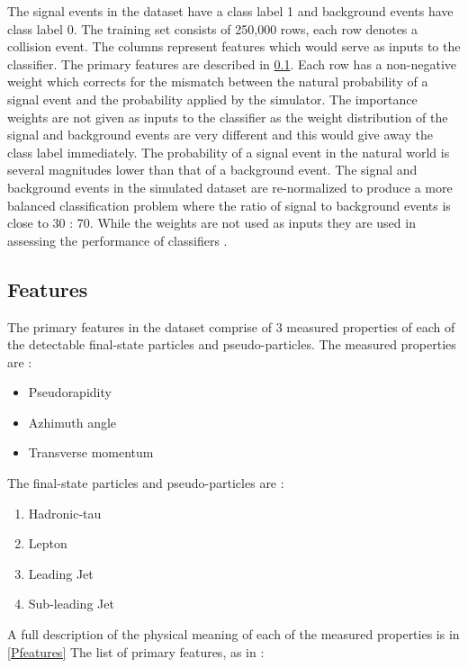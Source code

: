 \documentclass[final,3p,times,twocolumn]{elsarticle}
\begin{document}
The signal events in the dataset have a class label 1 and background events have class label 0. The training set consists of 250,000 rows, each row denotes a collision event. The columns represent features which would serve as inputs to the classifier. The primary features are described in \ref{features}. Each row has a non-negative weight which corrects for the mismatch between the natural probability of a signal event and the probability applied by the simulator. The importance weights are not given as inputs to the classifier as the weight distribution of the signal and background events are very different and this would give away the class label immediately. The probability of a signal event in the natural world is several magnitudes lower than that of a background event. The signal and background events in the simulated dataset  are re-normalized to produce a more balanced classification problem where the ratio of signal to background events is close to 30 : 70. While the weights are not used as inputs they are used in assessing the performance of classifiers \cite{CMS:1}.

\subsection{Features}
\label{features}

The primary features in the dataset comprise of 3 measured properties of each of the detectable final-state particles and pseudo-particles. The measured properties are :

\begin{itemize}[noitemsep]
\item Pseudorapidity 
\item{Azhimuth angle} 
\item{Transverse momentum}
\end{itemize}

The final-state particles and pseudo-particles are :

\begin{enumerate}[noitemsep]
\item{Hadronic-tau} 
\item{Lepton} 
\item{Leading Jet}
\item{Sub-leading Jet}
\end{enumerate}

A full description of the physical meaning of each of the measured properties is in \ref{Pfeatures} The list of primary features, as in \cite{RM} :
\end{document}

